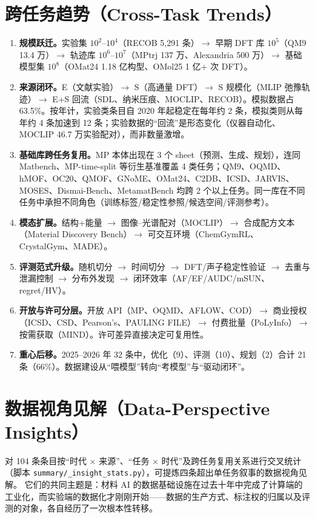 \documentclass[11pt,a4paper]{ctexart}
\begin{document}
\section{跨任务趋势（Cross-Task Trends）}

\begin{enumerate}
\item \textbf{规模跃迁。}实验集 $10^2$--$10^4$（RECOB 5,291 条）$\to$ 早期 DFT 库 $10^5$（QM9 13.4 万）$\to$ 轨迹库 $10^6$--$10^7$（MPtrj 137 万、Alexandria 500 万）$\to$ 基础模型集 $10^8$（OMat24 1.18 亿构型、OMol25 1 亿+ 次 DFT）。
\item \textbf{来源闭环。}E（文献实验）$\to$ S（高通量 DFT）$\to$ S 规模化（MLIP 弛豫轨迹）$\to$ E+S 回流（SDL、纳米压痕、MOCLIP、RECOB）。模拟数据占 63.5\%。按年计，实验类条目自 2020 年起稳定在每年约 2 条，模拟类则从每年约 4 条加速到 12 条；实验数据的``回流''是形态变化（仪器自动化、MOCLIP 46.7 万实验配对），而非数量激增。
\item \textbf{基础库跨任务复用。}MP 本体出现在 3 个 sheet（预测、生成、规划），连同 Matbench、MP-time-split 等衍生基准覆盖 4 类任务；QM9、OQMD、hMOF、OC20、QMOF、GNoME、OMat24、C2DB、ICSD、JARVIS、MOSES、Dismai-Bench、MetamatBench 均跨 2 个以上任务。同一库在不同任务中承担不同角色（训练标签/稳定性参照/候选空间/评测参考）。
\item \textbf{模态扩展。}结构+能量 $\to$ 图像--光谱配对（MOCLIP）$\to$ 合成配方文本（Material Discovery Bench）$\to$ 可交互环境（ChemGymRL、CrystalGym、MADE）。
\item \textbf{评测范式升级。}随机切分 $\to$ 时间切分 $\to$ DFT/声子稳定性验证 $\to$ 去重与泄漏控制 $\to$ 分布外发现 $\to$ 闭环效率（AF/EF/AUDC/mSUN、regret/HV）。
\item \textbf{开放与许可分层。}开放 API（MP、OQMD、AFLOW、COD）$\to$ 商业授权（ICSD、CSD、Pearson's、PAULING FILE）$\to$ 付费批量（PoLyInfo）$\to$ 按需获取（MIND）。许可差异直接决定可复用性。
\item \textbf{重心后移。}2025--2026 年 32 条中，优化（9）、评测（10）、规划（2）合计 21 条（66\%）。数据建设从``喂模型''转向``考模型''与``驱动闭环''。
\end{enumerate}

\section{数据视角见解（Data-Perspective Insights）}

对 104 条条目按``时代 $\times$ 来源''、``任务 $\times$ 时代''及跨任务复用关系进行交叉统计（脚本 \texttt{summary/\_insight\_stats.py}），可提炼四条超出单任务叙事的数据视角见解。
它们的共同主题是：材料 AI 的数据基础设施在过去十年中完成了计算端的工业化，而实验端的数据化才刚刚开始——数据的生产方式、标注权的归属以及评测的对象，各自经历了一次根本性转移。
\end{document}
